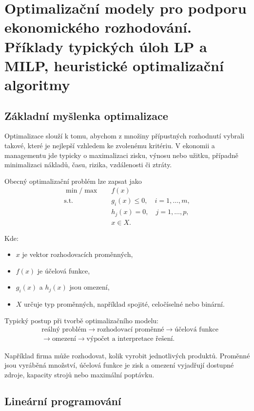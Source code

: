 \section{Optimalizační modely pro podporu ekonomického rozhodování. Příklady typických úloh LP a MILP, heuristické optimalizační algoritmy}

\subsection{Základní myšlenka optimalizace}

Optimalizace slouží k tomu, abychom z množiny přípustných rozhodnutí vybrali takové, které je
nejlepší vzhledem ke zvolenému kritériu. V ekonomii a managementu jde typicky o maximalizaci
zisku, výnosu nebo užitku, případně minimalizaci nákladů, času, rizika, vzdálenosti či ztráty.

Obecný optimalizační problém lze zapsat jako
\[
\begin{aligned}
\min/\max \quad & f(x)\\
\text{s.t.}\quad & g_i(x)\le 0,\quad i=1,\dots,m,\\
& h_j(x)=0,\quad j=1,\dots,p,\\
& x\in X.
\end{aligned}
\]

Kde:
\begin{itemize}
    \item $x$ je vektor rozhodovacích proměnných,
    \item $f(x)$ je účelová funkce,
    \item $g_i(x)$ a $h_j(x)$ jsou omezení,
    \item $X$ určuje typ proměnných, například spojité, celočíselné nebo binární.
\end{itemize}

Typický postup při tvorbě optimalizačního modelu:
\[
\begin{aligned}
&\text{reálný problém}
\rightarrow \text{rozhodovací proměnné}
\rightarrow \text{účelová funkce} \\
&\rightarrow \text{omezení}
\rightarrow \text{výpočet a interpretace řešení}.
\end{aligned}
\]

Například firma může rozhodovat, kolik vyrobit jednotlivých produktů. Proměnné jsou vyráběná
množství, účelová funkce je zisk a omezení vyjadřují dostupné zdroje, kapacity strojů nebo maximální
poptávku.

\subsection{Lineární programování}

